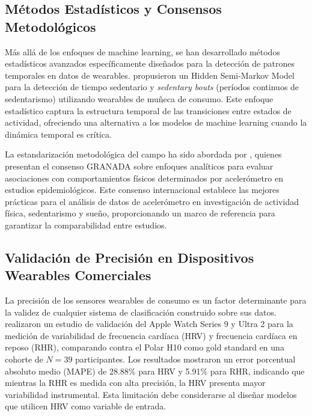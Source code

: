 \subsection{Métodos Estadísticos y Consensos Metodológicos}
\label{subsec:metodos_estadisticos}

Más allá de los enfoques de machine learning, se han desarrollado métodos estadísticos avanzados específicamente diseñados para la detección de patrones temporales en datos de wearables. \cite{Salim2024STEPHEN} propusieron un Hidden Semi-Markov Model para la detección de tiempo sedentario y \textit{sedentary bouts} (períodos continuos de sedentarismo) utilizando wearables de muñeca de consumo. Este enfoque estadístico captura la estructura temporal de las transiciones entre estados de actividad, ofreciendo una alternativa a los modelos de machine learning cuando la dinámica temporal es crítica.

La estandarización metodológica del campo ha sido abordada por \cite{Migueles2022GRANADA}, quienes presentan el consenso GRANADA sobre enfoques analíticos para evaluar asociaciones con comportamientos físicos determinados por acelerómetro en estudios epidemiológicos. Este consenso internacional establece las mejores prácticas para el análisis de datos de acelerómetro en investigación de actividad física, sedentarismo y sueño, proporcionando un marco de referencia para garantizar la comparabilidad entre estudios.

\subsection{Validación de Precisión en Dispositivos Wearables Comerciales}
\label{subsec:validacion_wearables}

La precisión de los sensores wearables de consumo es un factor determinante para la validez de cualquier sistema de clasificación construido sobre sus datos. \cite{OGrady2024AppleWatch} realizaron un estudio de validación del Apple Watch Series 9 y Ultra 2 para la medición de variabilidad de frecuencia cardíaca (HRV) y frecuencia cardíaca en reposo (RHR), comparando contra el Polar H10 como gold standard en una cohorte de $N=39$ participantes. Los resultados mostraron un error porcentual absoluto medio (MAPE) de 28.88\% para HRV y 5.91\% para RHR, indicando que mientras la RHR es medida con alta precisión, la HRV presenta mayor variabilidad instrumental. Esta limitación debe considerarse al diseñar modelos que utilicen HRV como variable de entrada.

